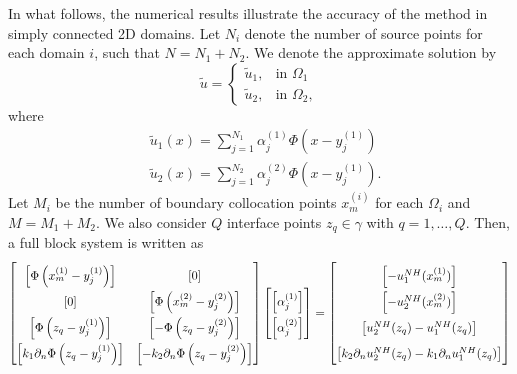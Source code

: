 In what follows, the numerical results illustrate the accuracy of the method in simply connected 2D domains. Let \(N_i\) denote the number of source points for each domain \(i\), such that \(N=N_1+N_2\). We denote the approximate solution by
\[
    \tilde{u} = \begin{cases}
        \tilde{u}_1, & \text{in } \Omega_1\\
        \tilde{u}_2, & \text{in } \Omega_2,
    \end{cases}
\]
where
\begin{align*}
    &\tilde{u}_1(x) = \sum_{j=1}^{N_1} \alpha^{(1)}_j \Phi\left(x-y_j^{(1)}\right)\\
    &\tilde{u}_2(x) = \sum_{j=1}^{N_2} \alpha^{(2)}_j \Phi\left(x-y_j^{(1)}\right).
\end{align*}
Let \(M_i\) be the number of boundary collocation points \(x^{(i)}_{m}\) for each \(\Omega_i\) and \(M=M_1+M_2\). We also consider \(Q\) interface points \(z_q \in \gamma\) with \(q=1,\dots,Q\). Then, a full block system is written as
\begin{equation}\label{MFS_transmission_classical_matrices_system}
    \renewcommand{\arraystretch}{1.75} %
    \begin{bmatrix}
        \left[\Phi\left(x^{(1)}_{m}-y_j^{(1)}\right)\right] & [0] \\
        [0] & \left[\Phi\left(x^{(2)}_{m}-y_j^{(2)}\right)\right] \\
        \left[\Phi\left(z_q-y_j^{(1)}\right)\right] & \left[-\Phi\left(z_q-y_j^{(2)}\right)\right] \\
        \left[k_1\partial_n \Phi\left(z_q-y_j^{(1)}\right)\right] & \left[-k_2 \partial_n \Phi\left(z_q-y_j^{(2)}\right)\right]
    \end{bmatrix}
    \begin{bmatrix}
        \left[\alpha^{(1)}_j\right]\\
        \left[\alpha^{(2)}_j\right]
    \end{bmatrix}=
    \begin{bmatrix}
        \left[-u_1^{NH}(x^{(1)}_{m})\right]\\
        \left[-u_2^{NH}(x^{(2)}_{m})\right]\\
        \left[u_2^{NH}(z_q)-u_1^{NH}(z_q)\right]\\
        \left[k_2 \partial_n u_2^{NH}(z_q)- k_1 \partial_n u_1^{NH}(z_q)\right]\\
    \end{bmatrix}
\end{equation}

